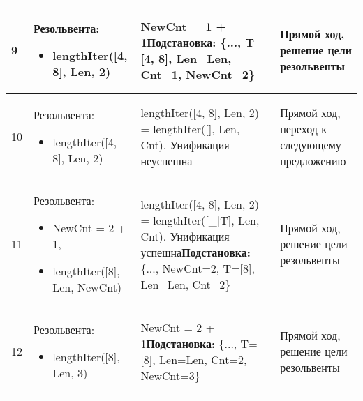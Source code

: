 \documentclass[14pt,a4paper]{scrreprt}
\begin{document}
\begin{table}[H]
\begin{tabular}{|p{0.8cm\small}|p{4.7cm\small}|p{5.7cm\small}|p{4cm\small}|}
		\hline
		9 & Резольвента: \begin{itemize} \item lengthIter([4, 8], Len, 2) \end{itemize} & NewCnt = 1 + 1\linebreak \textbf{Подстановка:} \{..., T=[4, 8], Len=Len, Cnt=1, NewCnt=2\} & Прямой ход, решение цели резольвенты \\
		\hline
		10 & Резольвента: \begin{itemize} \item lengthIter([4, 8], Len, 2) \end{itemize} & lengthIter([4, 8], Len, 2) = lengthIter([], Len, Cnt). Унификация неуспешна & Прямой ход, переход к следующему предложению\\
		\hline
		11 & Резольвента: \begin{itemize} \item NewCnt = 2 + 1, \item lengthIter([8], Len, NewCnt) \end{itemize} & lengthIter([4, 8], Len, 2) = lengthIter([\_|T], Len, Cnt). Унификация успешна\linebreak \textbf{Подстановка:} \{..., NewCnt=2, T=[8], Len=Len, Cnt=2\} & Прямой ход, решение цели резольвенты \\
		\hline
		12 & Резольвента: \begin{itemize} \item lengthIter([8], Len, 3) \end{itemize} & NewCnt = 2 + 1\linebreak \textbf{Подстановка:} \{..., T=[8], Len=Len, Cnt=2, NewCnt=3\} & Прямой ход, решение цели резольвенты \\
		\hline
	\end{tabular}
\end{table}
\end{document}
